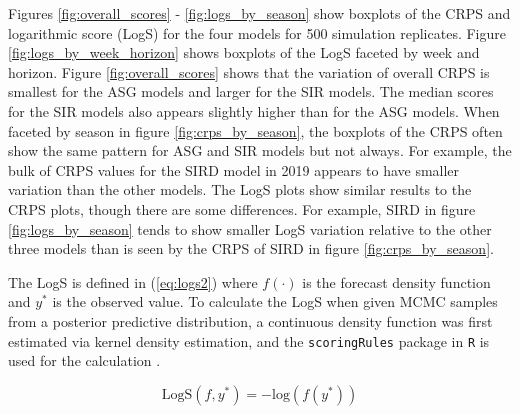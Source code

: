 \documentclass[ba]{imsart}
\theoremstyle{plain}
\theoremstyle{definition}
\theoremstyle{remark}
\begin{document}
\begin{supplement}
Figures \ref{fig:overall_scores} - \ref{fig:logs_by_season} show boxplots of the CRPS and logarithmic score (LogS) for the four models for 500 simulation replicates. Figure \ref{fig:logs_by_week_horizon} shows 
boxplots of the LogS faceted by week and horizon. Figure \ref{fig:overall_scores} shows that the variation of overall CRPS is smallest for the ASG models and larger for the SIR models. The median scores for the SIR models also appears slightly higher than for the ASG models. 
When faceted by season in figure \ref{fig:crps_by_season}, the boxplots of the CRPS often show the same pattern for ASG and SIR models but not always. For example, the bulk of CRPS values for the SIRD model in 2019 appears to have smaller variation than the other models.
The LogS plots show similar results to the CRPS plots, though there are some differences. For example, SIRD in figure \ref{fig:logs_by_season} tends to show smaller LogS variation relative to the other three models than is seen by the CRPS of SIRD in figure \ref{fig:crps_by_season}.

The LogS is defined in (\ref{eq:logs2}) where $f(\cdot)$ is the forecast density function and $y^*$ is the observed value. To calculate the LogS when given MCMC samples from a posterior predictive distribution, a continuous density function was first estimated via kernel density estimation, and the \texttt{scoringRules} package in \texttt{R} is used for the calculation \cite[]{jordan2019scoring}.

\begin{equation}
    \text{LogS}(f, y^*) = -\text{log}(f(y^*))
    \label{eq:logs2}
\end{equation}



\end{supplement}
\end{document}
